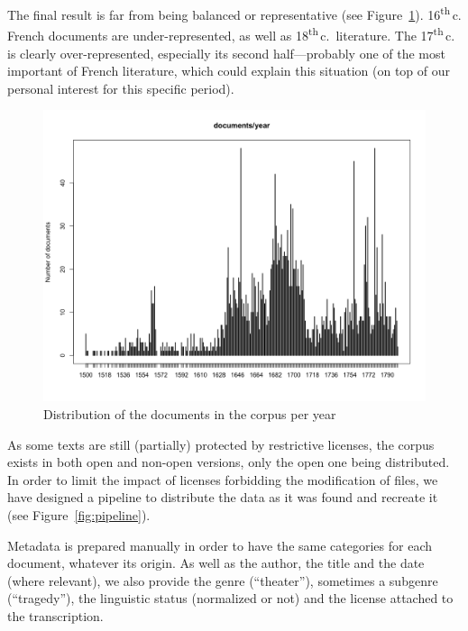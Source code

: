 The final result is far from being balanced or representative (see Figure~\ref{fig:FreEMmax_desc}). 16\textsuperscript{th}\,c. French documents are under-represented, as well as 18\textsuperscript{th}\,c.~literature. The 17\textsuperscript{th}\,c. is clearly over-represented, especially its second half---probably one of the most important of French literature, which could explain this situation (on top of our personal interest for this specific period).

\begin{figure}[ht]
    \centering
    \includegraphics[width=0.75\linewidth]{static/media/mod_eval/dalembert/desc_DalemBERT.png}
    \caption{Distribution of the documents in the \freemmax corpus per year}
    \label{fig:FreEMmax_desc}
\end{figure}

As some texts are still (partially) protected by restrictive licenses, the \freemmax corpus exists in both open and non-open versions, only the open one being distributed. In order to limit the impact of licenses forbidding the modification of files, we have designed a pipeline to distribute the data as it was found and recreate it (see Figure~\ref{fig:pipeline}).

Metadata is prepared manually in order to have the same categories for each document, whatever its origin. As well as the author, the title and the date (where relevant), we also provide the genre (``theater''), sometimes a subgenre (``tragedy''), the linguistic status (normalized or not) and the license attached to the transcription.

